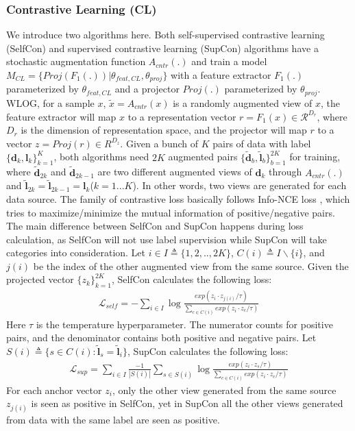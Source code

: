 \documentclass[letterpaper]{article} \usepackage{aaai22}  \usepackage{times}  \usepackage{helvet}  \usepackage{courier}  \usepackage[hyphens]{url}  \usepackage{graphicx} \usepackage{subfigure}
\begin{document}
\subsubsection{Contrastive Learning (CL)}
We introduce two algorithms here. Both self-supervised contrastive learning (SelfCon) and supervised contrastive learning (SupCon) algorithms have a stochastic augmentation function $A_{cntr}(.)$ and train a model $M_{CL} =\{Proj(F_1(.))|\theta_{feat,CL},\theta_{proj}\}$ with a feature extractor $F_1(.)$ parameterized by $\theta_{feat,CL}$ and a projector $Proj(.)$ parameterized by $\theta_{proj}$. WLOG, for a sample $x$, $\tilde{x} = A_{cntr}(x)$ is a randomly augmented view of $x$, the feature extractor will map $x$ to a representation vector $r=F_1(x) \in \mathcal{R}^{D_r}$, where $D_r$ is the dimension of representation space, and the projector will map $r$ to a vector $z=Proj(r) \in R^{D_z}$. Given a bunch of $K$ pairs of data with label $\{\textbf{d}_k, \textbf{l}_k\}_{k=1}^{K}$, both algorithms need $2K$ augmented pairs $\{\tilde{\textbf{d}}_b, \tilde{\textbf{l}}_b\}_{b=1}^{2K}$ for training, where $\tilde{\textbf{d}}_{2k}$ and $\tilde{\textbf{d}}_{2k-1}$ are two different augmented views of $\textbf{d}_k$ through $A_{cntr}(.)$ and $\tilde{\textbf{l}}_{2k}=\tilde{\textbf{l}}_{2k-1}=\textbf{l}_k$($k=1...K$). In other words, two views are generated for each data source. The family of contrastive loss basically follows Info-NCE loss \cite{oord2018representation}, which tries to maximize/minimize the mutual information of positive/negative pairs. The main difference between SelfCon and SupCon happens during loss calculation, as SelfCon will not use label supervision while SupCon will take categories into consideration. Let $i\in I \triangleq \{1,2,..,2K\}$, $C(i) \triangleq I \backslash \{i\}$, and $j(i)$ be the index of the other augmented view from the same source. Given the projected vector $\{z_k\}_{k=1}^{2K}$, SelfCon calculates the following loss:
\begin{equation}
    \begin{aligned}
    \mathcal{L}_{self} = - \sum_{i \in I} \log \frac{exp(z_i\cdot z_{j(i)}/\tau)}{\sum_{c \in C(i)}exp(z_i\cdot z_c/\tau)}
    \end{aligned}
\end{equation}
Here $\tau$ is the temperature hyperparameter. The numerator counts for positive pairs, and the denominator contains both positive and negative pairs. Let $S(i) \triangleq \{s \in C(i): \tilde{\textbf{l}}_s=\tilde{\textbf{l}}_i\}$, SupCon calculates the following loss:
\begin{equation}
    \begin{aligned}
    \mathcal{L}_{sup} = \sum_{i \in I} \frac{-1}{|S(i)|}\sum_{s \in S(i)}\log \frac{exp(z_i\cdot z_{s}/\tau)}{\sum_{c \in C(i)}exp(z_i\cdot z_c/\tau)}
    \end{aligned}
\end{equation}
For each anchor vector $z_i$, only the other view generated from the same source $z_{j(i)}$ is seen as positive in SelfCon, yet in SupCon all the other views generated from data with the same label are seen as positive.
\end{document}
